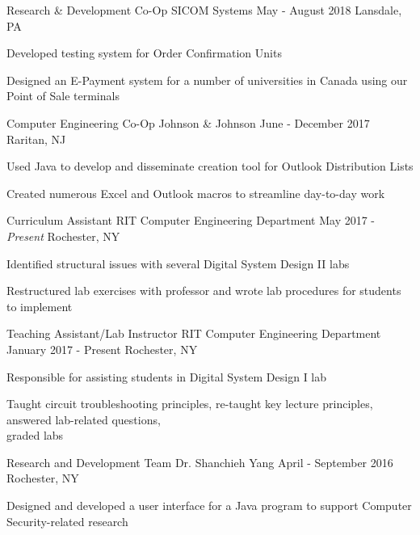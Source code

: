 \begin{cventries}
	\cventry
		{Research \& Development Co-Op}
		{SICOM Systems}
		{May - August 2018}
		{Lansdale, PA}
		{
			\begin{cvitems}
			\item {Developed testing system for Order Confirmation Units}
			\item {Designed an E-Payment system for a number of universities in Canada using our Point of Sale terminals}
			\end{cvitems}
		}
	\cventry
		{Computer Engineering Co-Op}
		{Johnson \& Johnson}
		{June - December 2017}
		{Raritan, NJ}
		{
			\begin{cvitems}
			\item {Used Java to develop and disseminate creation tool for Outlook Distribution Lists}
			\item {Created numerous Excel and Outlook macros to streamline day-to-day work}
			\end{cvitems}
		}

	\cventry
		{Curriculum Assistant}
		{RIT Computer Engineering Department}
		{May 2017 - \textit{Present}}
		{Rochester, NY}
		{
			\begin{cvitems}
			\item {Identified structural issues with several Digital System Design II labs}
			\item {Restructured lab exercises with professor and wrote lab procedures for students to implement}
			\end{cvitems}
		}

	\cventry
		{Teaching Assistant/Lab Instructor}
		{RIT Computer Engineering Department}
		{January 2017 - Present}
		{Rochester, NY}
		{
			\begin{cvitems}
			\item{Responsible for assisting students in Digital System Design I lab}
			\item{Taught circuit troubleshooting principles, re-taught key lecture principles, answered lab-related questions, \\graded labs}
			\end{cvitems}
		}

	\cventry
		{Research and Development Team}
		{Dr. Shanchieh Yang}
		{April - September 2016}
		{Rochester, NY}
		{
			\begin{cvitems}
			\item{Designed and developed a user interface for a Java program to support Computer Security-related research}
			\end{cvitems}
		}
\end{cventries}
